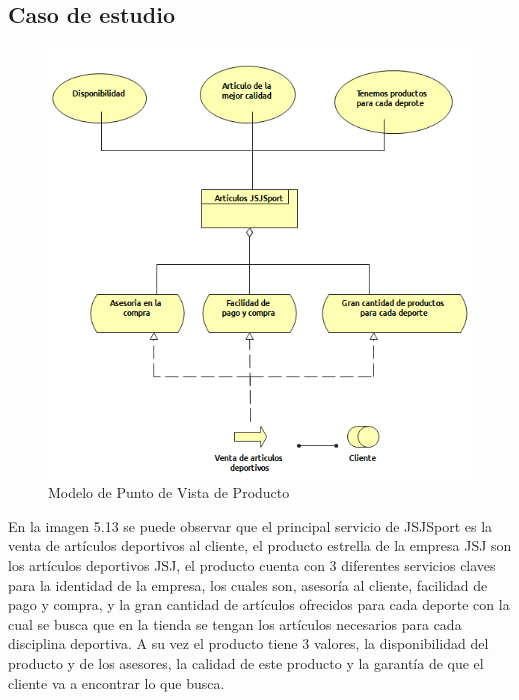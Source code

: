 \subsection{Caso de estudio}

\begin{figure}[th!]
	\centering
	\includegraphics[width=0.5\linewidth]{arquitectura/imagenes/VistaProducto}
	\caption{Modelo de Punto de Vista de Producto \cite{pun5}}
	\label{fig:modelo de punto de vista Producto}
\end{figure}
En la imagen 5.13 se puede observar que el principal servicio de JSJSport es la venta de artículos deportivos al cliente, el producto estrella de la empresa JSJ son los artículos deportivos JSJ, el producto cuenta con 3 diferentes servicios claves para la identidad de la empresa, los cuales son, asesoría al cliente, facilidad de pago y compra, y la gran cantidad de artículos ofrecidos para cada deporte con la cual se busca que en la tienda se tengan los artículos necesarios para cada disciplina deportiva.
A su vez el producto tiene 3 valores, la disponibilidad del producto y de los asesores, la calidad de este producto y la garantía de que el cliente va a encontrar lo que busca.

\newpage

